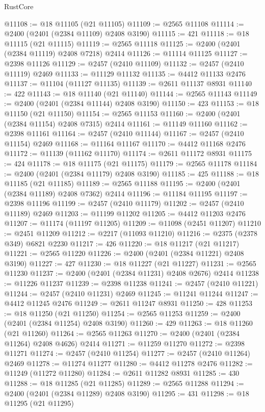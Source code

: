 \begin{lexlean}{RustCore}
\begin{coremodule}
@11108 := @18 @11105 (@21 @11105)
@11109 := @2565 @11108
@11114 := @2400 (@2401 (@2384 @11109) @2408 @3190)
@11115 := 421
@11118 := @18 @11115 (@21 @11115)
@11119 := @2565 @11118
@11125 := @2400 (@2401 (@2384 @11119) @2408 @7218) @2414
@11126 := @11114 @11125
@11127 := @2398 @11126
@11129 := @2457 (@2410 @11109)
@11132 := @2457 (@2410 @11119) @2469
@11133 := @11129 @11132
@11135 := @4412 @11133 @2476
@11137 := @11104 (@11127 @11135)
@11139 := @2611 @11137 @8931
@11140 := 422
@11143 := @18 @11140 (@21 @11140)
@11144 := @2565 @11143
@11149 := @2400 (@2401 (@2384 @11144) @2408 @3190)
@11150 := 423
@11153 := @18 @11150 (@21 @11150)
@11154 := @2565 @11153
@11160 := @2400 (@2401 (@2384 @11154) @2408 @7315) @2414
@11161 := @11149 @11160
@11162 := @2398 @11161
@11164 := @2457 (@2410 @11144)
@11167 := @2457 (@2410 @11154) @2469
@11168 := @11164 @11167
@11170 := @4412 @11168 @2476
@11172 := @11139 (@11162 @11170)
@11174 := @2611 @11172 @8931
@11175 := 424
@11178 := @18 @11175 (@21 @11175)
@11179 := @2565 @11178
@11184 := @2400 (@2401 (@2384 @11179) @2408 @3190)
@11185 := 425
@11188 := @18 @11185 (@21 @11185)
@11189 := @2565 @11188
@11195 := @2400 (@2401 (@2384 @11189) @2408 @7362) @2414
@11196 := @11184 @11195
@11197 := @2398 @11196
@11199 := @2457 (@2410 @11179)
@11202 := @2457 (@2410 @11189) @2469
@11203 := @11199 @11202
@11205 := @4412 @11203 @2476
@11207 := @11174 (@11197 @11205)
@11209 := @11098 (@2451 @11207)
@11210 := @2451 @11209
@11212 := @2217 (@11093 @11210)
@11216 := @2375 (@2378 @349) @6821 @2230
@11217 := 426
@11220 := @18 @11217 (@21 @11217)
@11221 := @2565 @11220
@11226 := @2400 (@2401 (@2384 @11221) @2408 @3190)
@11227 := 427
@11230 := @18 @11227 (@21 @11227)
@11231 := @2565 @11230
@11237 := @2400 (@2401 (@2384 @11231) @2408 @2676) @2414
@11238 := @11226 @11237
@11239 := @2398 @11238
@11241 := @2457 (@2410 @11221)
@11244 := @2457 (@2410 @11231) @2469
@11245 := @11241 @11244
@11247 := @4412 @11245 @2476
@11249 := @2611 @11247 @8931
@11250 := 428
@11253 := @18 @11250 (@21 @11250)
@11254 := @2565 @11253
@11259 := @2400 (@2401 (@2384 @11254) @2408 @3190)
@11260 := 429
@11263 := @18 @11260 (@21 @11260)
@11264 := @2565 @11263
@11270 := @2400 (@2401 (@2384 @11264) @2408 @4626) @2414
@11271 := @11259 @11270
@11272 := @2398 @11271
@11274 := @2457 (@2410 @11254)
@11277 := @2457 (@2410 @11264) @2469
@11278 := @11274 @11277
@11280 := @4412 @11278 @2476
@11282 := @11249 (@11272 @11280)
@11284 := @2611 @11282 @8931
@11285 := 430
@11288 := @18 @11285 (@21 @11285)
@11289 := @2565 @11288
@11294 := @2400 (@2401 (@2384 @11289) @2408 @3190)
@11295 := 431
@11298 := @18 @11295 (@21 @11295)

\end{coremodule}
\end{lexlean}
